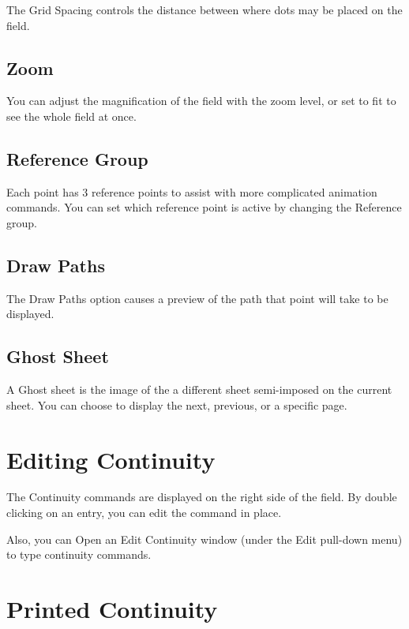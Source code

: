 The Grid Spacing controls the distance between where dots may be placed on the field.

\subsection{Zoom}\label{zoomlevel}

You can adjust the magnification of the field with the zoom level, or set to fit to see the whole field at once.

\subsection{Reference Group}\label{referencegroup}

Each point has 3 reference points to assist with more complicated animation commands.  You can set which reference point is active by changing the Reference group.

\subsection{Draw Paths}\label{drawpaths}

The Draw Paths option causes a preview of the path that point will take to be displayed. 

\subsection{Ghost Sheet}\label{ghostsheet}

A Ghost sheet is the image of the a different sheet semi-imposed on the current sheet.
You can choose to display the next, previous, or a specific page.

\section{Editing Continuity}\label{editcont}

The Continuity commands are displayed on the right side of the field.  By double clicking on an entry, you can edit the command in place.

Also, you can Open an Edit Continuity window (under the Edit pull-down menu) to type
continuity commands.

\section{Printed Continuity}\label{printcont}

